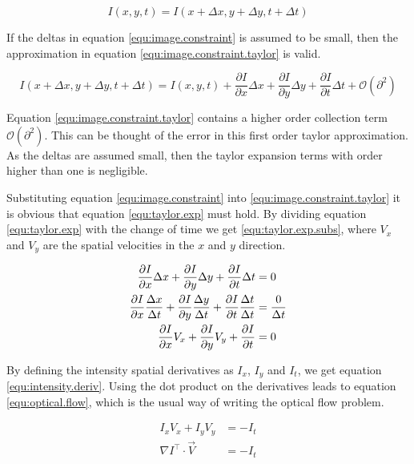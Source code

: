 \begin{equation}
I(x,y,t) = I(x + \Delta x, y+ \Delta y, t + \Delta t)
\label{equ:image.constraint}
\end{equation}

If the deltas in equation \eqref{equ:image.constraint} is assumed to be small, then the approximation in equation \eqref{equ:image.constraint.taylor} is valid.

\begin{equation}
I(x + \Delta x, y+ \Delta y, t + \Delta t) = I(x,y,t) + \frac{\partial I}{\partial x} \Delta x + \frac{\partial I}{\partial y} \Delta y + \frac{\partial I}{\partial t} \Delta t + \mathcal{O}(\partial^2)
\label{equ:image.constraint.taylor}
\end{equation}

Equation \eqref{equ:image.constraint.taylor} contains a higher order collection term $\mathcal{O}(\partial^2)$. This can be thought of the error in this first order taylor approximation. As
the deltas are assumed small, then the taylor expansion terms with order higher than one is negligible. 

Substituting equation \eqref{equ:image.constraint} into \eqref{equ:image.constraint.taylor} it is obvious that equation \eqref{equ:taylor.exp} must hold. 
By dividing equation \eqref{equ:taylor.exp} with the change of time we get \eqref{equ:taylor.exp.subs}, where $V_x$ and $V_y$ are the spatial velocities in the 
$x$ and $y$ direction.

\begin{align}
\frac{\partial I}{\partial x} \Delta x + \frac{\partial I}{\partial y} \Delta y + \frac{\partial I}{\partial t} \Delta t &= 0 \label{equ:taylor.exp} \\
\frac{\partial I}{\partial x} \frac{\Delta x}{\Delta t} + \frac{\partial I}{\partial y} \frac{\Delta y}{\Delta t} + \frac{\partial I}{\partial t} \frac{\Delta t}{\Delta t} &= \frac{0}{\Delta t} \notag \\
\frac{\partial I}{\partial x} V_x + \frac{\partial I}{\partial y} V_y + \frac{\partial I}{\partial t}  &= 0 \label{equ:taylor.exp.subs}
\end{align}

By defining the intensity spatial derivatives as $I_x$, $I_y$ and $I_t$, we get equation \eqref{equ:intensity.deriv}. Using the dot product on the derivatives 
leads to equation \eqref{equ:optical.flow}, which is the usual way of writing the optical flow problem.

\begin{align}
I_x V_x + I_y V_y &= -I_t \label{equ:intensity.deriv} \\
\nabla I^\top \cdot \vec{V} &= -I_t \label{equ:optical.flow}
\end{align}

